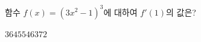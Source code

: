함수 $f(x)=(3x^2-1)^3$에 대하여 $f'(1)$의 값은?
\begin{choices32}{$36$}{$45$}{$54$}{$63$}{$72$}\end{choices32}

